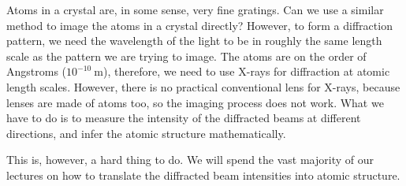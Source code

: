 \documentclass{article}
\theoremstyle{plain}\theoremheaderfont{\normalfont\itshape}\theorembodyfont{\rmfamily}\theoremseparator{.}\newtheorem*{rem}{Remark}\newtheorem*{ex}{Example}\newtheorem*{proof}{Proof}\newtheorem*{altp}{Alternative proof}
\theoremstyle{plain}\theoremheaderfont{\normalfont\bfseries}\theorembodyfont{\rmfamily}\theoremseparator{.}\newtheorem{thm}{Theorem}[section]\newtheorem{lem}[thm]{Lemma}\newtheorem{prop}[thm]{Proposition}\newtheorem*{cor}{Corollary}\newtheorem{defn}[thm]{Definition}\newtheorem{clm}[thm]{Claim}\newtheorem{clminproof}{Claim}\newtheorem*{law}{Law}\newtheorem{pos}[thm]{Postulate}
\theoremstyle{break}\theoremheaderfont{\normalfont\itshape}\theorembodyfont{\rmfamily}\theoremseparator{.\medskip}\newtheorem*{proofskip}{Proof}\newtheorem*{exs}{Examples}\newtheorem*{rems}{Remarks}
\theoremstyle{break}\theoremheaderfont{\normalfont\bfseries}\theorembodyfont{\rmfamily}\theoremseparator{.\medskip}\newtheorem{lemskip}[thm]{Lemma}\newtheorem{defnskip}[thm]{Definition}\newtheorem{propskip}[thm]{Proposition}\newtheorem{thmskip}[thm]{Theorem}
\numberwithin{equation}{section}
\newcommand{\unit}[1]{\ \mathrm{#1}}
\begin{document}
    Atoms in a crystal are, in some sense, very fine gratings. Can we use a similar method to image the atoms in a crystal directly? However, to form a diffraction pattern, we need the wavelength of the light to be in roughly the same length scale as the pattern we are trying to image. The atoms are on the order of Angstroms (\(10^{-10}\unit{m}\)), therefore, we need to use X-rays for diffraction at atomic length scales. However, there is no practical conventional lens for X-rays, because lenses are made of atoms too, so the imaging process does not work. What we have to do is to measure the intensity of the diffracted beams at different directions, and infer the atomic structure mathematically.

    This is, however, a hard thing to do. We will spend the vast majority of our lectures on how to translate the diffracted beam intensities into atomic structure.
\end{document}
